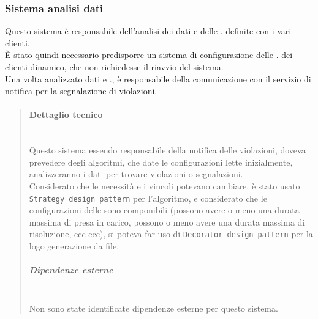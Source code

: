         \subsubsection{Sistema analisi dati}
            Questo sistema è responsabile dell'analisi dei dati e delle . definite con i vari clienti. \\
            È stato quindi necessario predisporre un sistema di configurazione delle . dei clienti dinamico, che non richiedesse il riavvio del sistema. \\
            Una volta analizzato dati e ., è responsabile  della comunicazione con il servizio di notifica per la segnalazione di violazioni.
            \begin{quote}
            	\mbox{}%
            	\vspace{-1cm}
                \paragraph{Dettaglio tecnico}
                	 \mbox{}\\
                    Questo sistema essendo responsabile della notifica delle violazioni, doveva prevedere degli algoritmi, che date le configurazioni lette inizialmente, analizzeranno i dati per trovare violazioni o segnalazioni. \\
                    Considerato che le necessità e i vincoli potevano cambiare, è stato usato \texttt{Strategy design pattern} per l'algoritmo, e considerato che le configurazioni delle  sono componibili (possono avere o meno una durata massima di presa in carico, possono o meno avere una durata massima di risoluzione, ecc ecc), si poteva far uso di \texttt{Decorator design pattern} per la logo generazione da file.
                    \subparagraph{Dipendenze esterne}
                    \mbox{} \\
                        Non sono state identificate dipendenze esterne per questo sistema.
            \end{quote}
